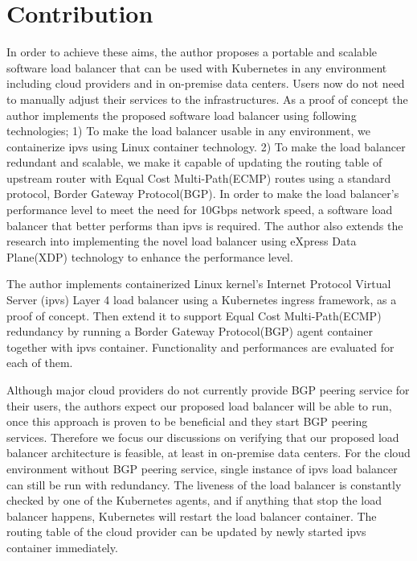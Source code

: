 \section{Contribution}

In order to achieve these aims, the author proposes a portable and scalable software load balancer that can be used with Kubernetes in any environment including cloud providers and in on-premise data centers.
Users now do not need to manually adjust their services to the infrastructures.
As a proof of concept the author implements the proposed software load balancer using following technologies;
1) To make the load balancer usable in any environment, we containerize ipvs\cite{Zhang2000} using Linux container technology\cite{menage2007adding}.
2) To make the load balancer redundant and scalable, we make it capable of updating the routing table of upstream router with Equal Cost Multi-Path(ECMP) routes\cite{al2008scalable} using a standard protocol, Border Gateway Protocol(BGP).
In order to make the load balancer's performance level to meet the need for 10Gbps network speed, a software load balancer that better performs than ipvs is required.
The author also extends the research into implementing the novel load balancer using eXpress Data Plane(XDP) technology\cite{bertin2017xdp} to enhance the performance level.

The author implements containerized Linux kernel's Internet Protocol Virtual Server (ipvs)\cite{Zhang2000} Layer 4 load balancer using a Kubernetes ingress\cite{K8sIngress2017} framework, as a proof of concept.
Then extend it to support Equal Cost Multi-Path(ECMP)\cite{thaler2000multipath} redundancy by running a Border Gateway Protocol(BGP) agent container together with ipvs container.
Functionality and performances are evaluated for each of them.

Although major cloud providers do not currently provide BGP peering service for their users, the authors expect our proposed load balancer will be able to run, once this approach is proven to be beneficial and they start BGP peering services.
Therefore we focus our discussions on verifying that our proposed load balancer architecture is feasible, at least in on-premise data centers.
For the cloud environment without BGP peering service, single instance of ipvs load balancer can still be run with redundancy.
The liveness of the load balancer is constantly checked by one of the Kubernetes agents, and if anything that stop the load balancer happens, Kubernetes will restart the load balancer container.
The routing table of the cloud provider can be updated by newly started ipvs container immediately.


